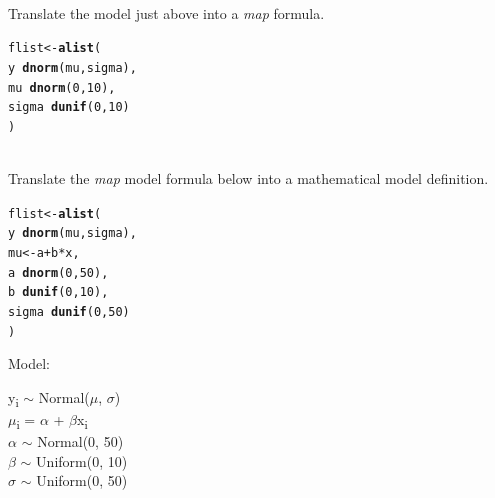 \documentclass[12pt]{article}\usepackage[]{graphicx}\usepackage[]{color}
\makeatletter
\newcommand{\hlnum}[1]{\textcolor[rgb]{0.686,0.059,0.569}{#1}}%
\newcommand{\hlopt}[1]{\textcolor[rgb]{0,0,0}{#1}}%
\newcommand{\hlstd}[1]{\textcolor[rgb]{0.345,0.345,0.345}{#1}}%
\newcommand{\hlkwb}[1]{\textcolor[rgb]{0.69,0.353,0.396}{#1}}%
\newcommand{\hlkwd}[1]{\textcolor[rgb]{0.737,0.353,0.396}{\textbf{#1}}}%
\newenvironment{kframe}{%
 \def\at@end@of@kframe{}%
 \ifinner\ifhmode%
  \def\at@end@of@kframe{\end{minipage}}%
  \begin{minipage}{\columnwidth}%
 \fi\fi%
 \def\FrameCommand##1{\hskip\@totalleftmargin \hskip-\fboxsep
 \colorbox{shadecolor}{##1}\hskip-\fboxsep
     \hskip-\linewidth \hskip-\@totalleftmargin \hskip\columnwidth}%
 \MakeFramed {\advance\hsize-\width
   \@totalleftmargin\z@ \linewidth\hsize
   \@setminipage}}%
 {\par\unskip\endMakeFramed%
 \at@end@of@kframe}
\newenvironment{knitrout}{}{} %
\newenvironment{problem}[2][Problem]{\begin{trivlist}
\item[\hskip \labelsep {\bfseries #1}\hskip \labelsep {\bfseries #2.}]}{\end{trivlist}}
\makeatother
\begin{document}
\begin{problem}{4M2}
\text{}\\
Translate the model just above into a \textit{map} formula.
\end{problem}

\begin{knitrout}
\color{fgcolor}\begin{kframe}
\begin{alltt}
\hlstd{flist} \hlkwb{<-} \hlkwd{alist}\hlstd{(}
  \hlstd{y} \hlopt{~} \hlkwd{dnorm}\hlstd{(mu, sigma),}
  \hlstd{mu} \hlopt{~} \hlkwd{dnorm}\hlstd{(}\hlnum{0}\hlstd{,} \hlnum{10}\hlstd{),}
  \hlstd{sigma} \hlopt{~} \hlkwd{dunif}\hlstd{(}\hlnum{0}\hlstd{,} \hlnum{10}\hlstd{)}
\hlstd{)}
\end{alltt}
\end{kframe}
\end{knitrout}

\begin{problem}{4M3}
\text{}\\
Translate the \textit{map} model formula below into a mathematical model definition.

\begin{knitrout}
\color{fgcolor}\begin{kframe}
\begin{alltt}
\hlstd{flist} \hlkwb{<-} \hlkwd{alist}\hlstd{(}
  \hlstd{y} \hlopt{~} \hlkwd{dnorm}\hlstd{(mu, sigma),}
  \hlstd{mu} \hlkwb{<-} \hlstd{a} \hlopt{+}\hlstd{b}\hlopt{*}\hlstd{x,}
  \hlstd{a} \hlopt{~} \hlkwd{dnorm}\hlstd{(}\hlnum{0}\hlstd{,} \hlnum{50}\hlstd{),}
  \hlstd{b} \hlopt{~} \hlkwd{dunif}\hlstd{(}\hlnum{0}\hlstd{,} \hlnum{10}\hlstd{),}
  \hlstd{sigma} \hlopt{~} \hlkwd{dunif}\hlstd{(}\hlnum{0}\hlstd{,} \hlnum{50}\hlstd{)}
\hlstd{)}
\end{alltt}
\end{kframe}
\end{knitrout}
\end{problem}

Model:
\begin{center}
y\textsubscript{i} $\sim$ Normal($\mu$, $\sigma$)\\
$\mu$\textsubscript{i} = $\alpha$ + $\beta$x\textsubscript{i}\\
$\alpha$ $\sim$ Normal(0, 50)\\
$\beta$ $\sim$ Uniform(0, 10)\\
$\sigma$ $\sim$ Uniform(0, 50)
\end{center}
\end{document}
